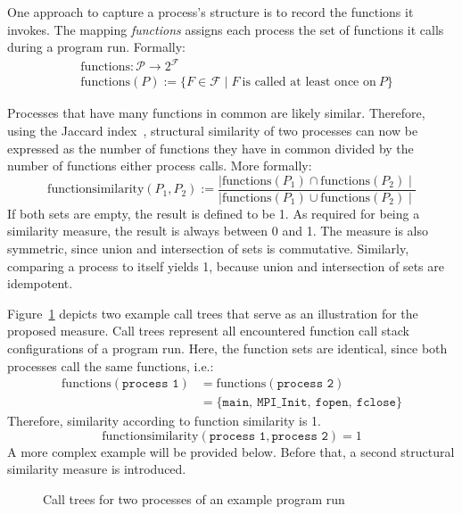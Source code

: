 \documentclass[a4paper, final, diplominf]{zih-template}
\begin{document}
One approach to capture a process's structure is to record the functions it invokes.
The mapping \emph{functions} assigns each process the set of functions it calls during a program run.
Formally:
\begin{equation*}
	\begin{aligned}
		& \text{functions} : \mathcal{P} \to 2^\mathcal{F} \\
		& \text{functions}(P) := \{ F \in \mathcal{F} \mid F~\text{is called at least once on}~P \}
	\end{aligned}
\end{equation*}

Processes that have many functions in common are likely similar.
Therefore, using the Jaccard index~\cite{jaccard01}, structural similarity of two processes can now be expressed as the number of functions they have in common divided by the number of functions either process calls. More formally:
\begin{equation*}
	\text{functionsimilarity}(P_1, P_2) := \frac{ \mid \text{functions}(P_1) \cap \text{functions}(P_2) \mid }{ \mid \text{functions}(P_1) \cup \text{functions}(P_2) \mid }
\end{equation*}
If both sets are empty, the result is defined to be 1.
As required for being a similarity measure, the result is always between 0 and 1.
The measure is also symmetric, since union and intersection of sets is commutative.
Similarly, comparing a process to itself yields 1, because union and intersection of sets are idempotent.

Figure~\ref{fig:example-call-tree} depicts two example call trees that serve as an illustration for the proposed measure.
Call trees represent all encountered function call stack configurations of a program run.
Here, the function sets are identical, since both processes call the same functions, i.e.:
\begin{equation*}
	\begin{aligned}
		\mathrm{functions}(\texttt{process 1}) & = \mathrm{functions}(\texttt{process 2}) \\
		                                       & = \{ \texttt{main},~ \texttt{MPI\_Init},~ \texttt{fopen},~ \texttt{fclose} \}
	\end{aligned}
\end{equation*}
Therefore, similarity according to function similarity is 1.
\begin{equation*}
	\text{functionsimilarity}(\texttt{process 1}, \texttt{process 2}) = 1
\end{equation*}
A more complex example will be provided below.
Before that, a second structural similarity measure is introduced.
\begin{figure}[tb]
	\centering
	
	\caption{Call trees for two processes of an example program run}
	\label{fig:example-call-tree}
\end{figure}
\end{document}
